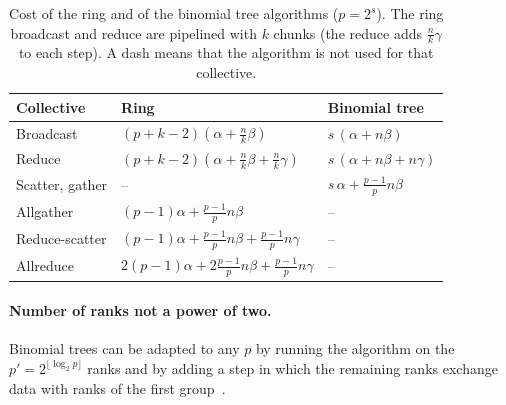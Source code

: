 \begin{table}[t]
\centering
\small
\caption{Cost of the ring and of the binomial tree algorithms ($p=2^s$). The ring broadcast and reduce are pipelined with $k$ chunks (the reduce adds $\tfrac{n}{k}\gamma$ to each step). A dash means that the algorithm is not used for that collective.}
\label{tab:bg-cost}
\begin{tabular}{@{}lll@{}}
\toprule
Collective & Ring & Binomial tree \\
\midrule
Broadcast & $(p+k-2)(\alpha+\tfrac{n}{k}\beta)$ & $s\,(\alpha+n\beta)$ \\
Reduce & $(p+k-2)(\alpha+\tfrac{n}{k}\beta+\tfrac{n}{k}\gamma)$ & $s\,(\alpha+n\beta+n\gamma)$ \\
Scatter, gather & -- & $s\,\alpha+\tfrac{p-1}{p}n\beta$ \\
Allgather & $(p-1)\alpha+\tfrac{p-1}{p}n\beta$ & -- \\
Reduce-scatter & $(p-1)\alpha+\tfrac{p-1}{p}n\beta+\tfrac{p-1}{p}n\gamma$ & -- \\
Allreduce & $2(p-1)\alpha+2\tfrac{p-1}{p}n\beta+\tfrac{p-1}{p}n\gamma$ & -- \\
\bottomrule
\end{tabular}
\end{table}

\paragraph{Number of ranks not a power of two.}
Binomial trees can be adapted to any $p$ by running the algorithm on the $p'=2^{\lfloor\log_2p\rfloor}$ ranks and by adding a step in which the remaining ranks exchange data with ranks of the first group~\cite{desensi2025bine}.

